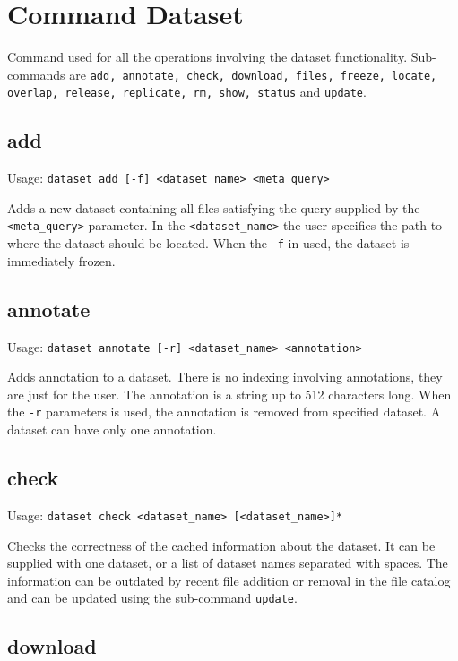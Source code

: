 \section{Command Dataset}
Command used for all the operations involving the dataset
functionality. Sub-commands are \texttt{add, annotate, check,
download, files, freeze, locate, overlap, release, replicate, rm,
show, status} and \texttt{update}.

\subsection{add}

Usage: \texttt{dataset add [-f] <dataset\_name> <meta\_query>}

Adds a new dataset containing all files satisfying the query
supplied by the \texttt{<meta\_query>} parameter. In the
\texttt{<dataset\_name>} the user specifies the path to where the
dataset should be located. When the \texttt{-f} in used, the
dataset is immediately frozen.

\subsection{annotate}

Usage: \texttt{dataset annotate [-r] <dataset\_name> <annotation>}

Adds annotation to a dataset. There is no indexing involving
annotations, they are just for the user. The annotation is a string
up to 512 characters long. When the \texttt{-r} parameters is used,
the annotation is removed from specified dataset. A dataset can
have only one annotation.

\subsection{check}

Usage: \texttt{dataset check <dataset\_name> [<dataset\_name>]*}

Checks the correctness of the cached information about the dataset.
It can be supplied with one dataset, or a list of dataset names
separated with spaces. The information can be outdated by recent
file addition or removal in the file catalog and can be updated
using the sub-command \texttt{update}.

\subsection{download}

